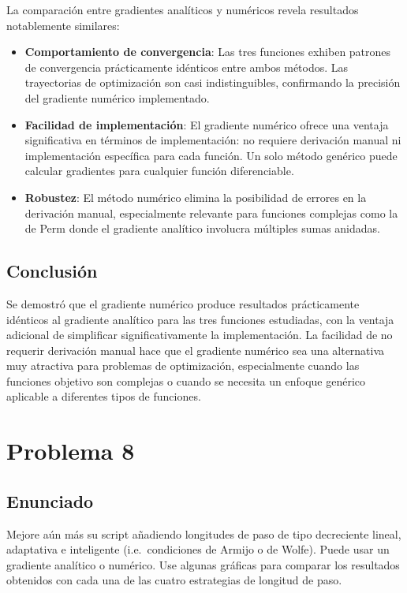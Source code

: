 \documentclass{article}
\begin{document}
La comparación entre gradientes analíticos y numéricos revela resultados notablemente similares:

\begin{itemize}
    \item \textbf{Comportamiento de convergencia}: Las tres funciones exhiben patrones de convergencia prácticamente idénticos entre ambos métodos. Las trayectorias de optimización son casi indistinguibles, confirmando la precisión del gradiente numérico implementado.
    
    \item \textbf{Facilidad de implementación}: El gradiente numérico ofrece una ventaja significativa en términos de implementación: no requiere derivación manual ni implementación específica para cada función. Un solo método genérico puede calcular gradientes para cualquier función diferenciable.
    
    \item \textbf{Robustez}: El método numérico elimina la posibilidad de errores en la derivación manual, especialmente relevante para funciones complejas como la de Perm donde el gradiente analítico involucra múltiples sumas anidadas.
\end{itemize}

\subsection{Conclusión}

Se demostró que el gradiente numérico produce resultados prácticamente idénticos al gradiente analítico para las tres funciones estudiadas, con la ventaja adicional de simplificar significativamente la implementación. La facilidad de no requerir derivación manual hace que el gradiente numérico sea una alternativa muy atractiva para problemas de optimización, especialmente cuando las funciones objetivo son complejas o cuando se necesita un enfoque genérico aplicable a diferentes tipos de funciones.


\section{Problema 8}

\subsection{Enunciado}
Mejore aún más su script añadiendo longitudes de paso de tipo decreciente lineal, adaptativa e inteligente (i.e.\ condiciones de Armijo o de Wolfe). Puede usar un gradiente analítico o numérico. Use algunas gráficas para comparar los resultados obtenidos con cada una de las cuatro estrategias de longitud de paso.
\end{document}
